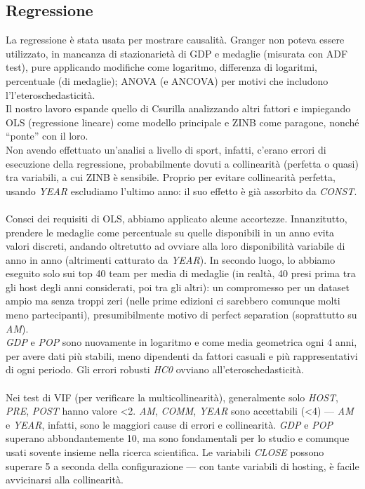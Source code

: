 \subsection{Regressione}\label{sec:methods_regression}

La regressione è stata usata per mostrare causalità. Granger non poteva essere
utilizzato, in mancanza di stazionarietà di GDP e medaglie (misurata con ADF
test), pure applicando modifiche come logaritmo, differenza di logaritmi,
percentuale (di medaglie); ANOVA (e ANCOVA) per motivi che includono
l'l'eteroschedasticità.\\

Il nostro lavoro espande quello di Csurilla\cite{csurillaLessObviousEffect2023}
analizzando altri fattori e impiegando OLS (regressione lineare) come modello
principale e ZINB come paragone, nonché ``ponte'' con il loro.\\
Non avendo effettuato un'analisi a livello di sport, infatti, c'erano errori di
esecuzione della regressione, probabilmente dovuti a collinearità (perfetta o
quasi) tra variabili, a cui ZINB è sensibile. Proprio per evitare collinearità
perfetta, usando \textit{YEAR} escludiamo l'ultimo anno: il suo effetto è già
assorbito da \textit{CONST}.\\
\\
Consci dei requisiti di OLS, abbiamo applicato alcune accortezze. Innanzitutto,
prendere le medaglie come percentuale su quelle disponibili in un anno evita
valori discreti, andando oltretutto ad ovviare alla loro disponibilità variabile
di anno in anno (altrimenti catturato da \textit{YEAR}). In secondo luogo, lo
abbiamo eseguito solo sui top 40 team per media di medaglie (in realtà, 40 presi
prima tra gli host degli anni considerati, poi tra gli altri): un compromesso
per un dataset ampio ma senza troppi zeri (nelle prime edizioni ci sarebbero
comunque molti meno partecipanti), presumibilmente motivo di perfect
separation\cite{WikipediaSeparation} (soprattutto su \textit{AM}).\\
\textit{GDP} e \textit{POP} sono nuovamente in logaritmo e come media geometrica
ogni 4 anni, per avere dati più stabili, meno dipendenti da fattori casuali e
più rappresentativi di ogni periodo. Gli errori robusti \textit{HC0} ovviano
all'eteroschedasticità.\\
\\


Nei test di VIF (per verificare la multicollinearità), generalmente solo
\textit{HOST}, \textit{PRE}, \textit{POST} hanno valore <2. \textit{AM},
\textit{COMM}, \textit{YEAR} sono accettabili (<4) --- \textit{AM} e
\textit{YEAR}, infatti, sono le maggiori cause di errori e collinearità.
\textit{GDP} e \textit{POP} superano abbondantemente 10, ma sono fondamentali
per lo studio e comunque usati sovente insieme nella ricerca scientifica. Le
variabili \textit{CLOSE} possono superare 5 a seconda della configurazione ---
con tante variabili di hosting, è facile avvicinarsi alla collinearità.
